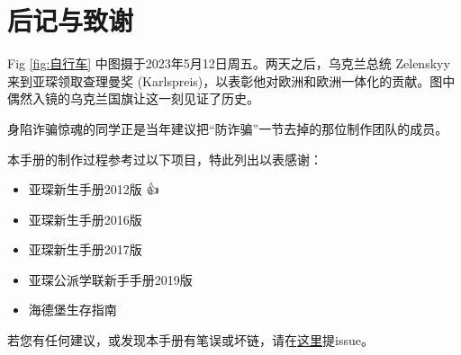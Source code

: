 
\chapter*{后记与致谢}


  Fig \ref{fig:自行车} 中图摄于2023年5月12日周五。两天之后，乌克兰总统 Zelenskyy 来到亚琛领取查理曼奖 (Karlspreis)，以表彰他对欧洲和欧洲一体化的贡献。图中偶然入镜的乌克兰国旗让这一刻见证了历史。

  身陷诈骗惊魂的同学正是当年建议把``防诈骗''一节去掉的那位制作团队的成员。

  本手册的制作过程参考过以下项目，特此列出以表感谢：
  \begin{itemize}
    \item 亚琛新生手册2012版 👍
    \item 亚琛新生手册2016版
    \item 亚琛新生手册2017版
    \item 亚琛公派学联新手手册2019版
    \item 海德堡生存指南
  \end{itemize}

  若您有任何建议，或发现本手册有笔误或坏链，请在\href{https://github.com/OChicken/HCWSA/issues/3}{这里}提issue。
